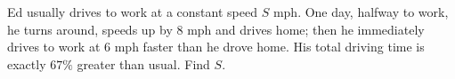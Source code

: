 Ed usually drives to work at a constant speed $S$ mph. One day, halfway to work, he turns around, speeds up by $8$ mph and drives home; then he immediately drives to work at $6$ mph faster than he drove home. His total driving time is exactly $67\%$ greater than usual. Find $S$.
